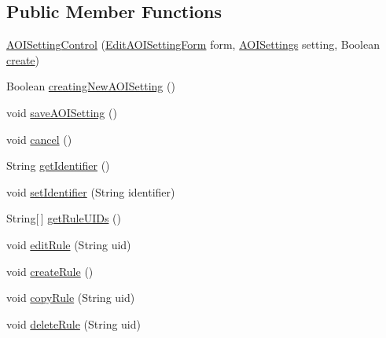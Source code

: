 \subsection*{Public Member Functions}
\begin{DoxyCompactItemize}
\item 
\hyperlink{class_web_analyzer_1_1_u_i_1_1_interaction_objects_1_1_a_o_i_setting_control_aba590b033948b15906956ea0314f6e46}{A\+O\+I\+Setting\+Control} (\hyperlink{class_web_analyzer_1_1_u_i_1_1_edit_a_o_i_setting_form}{Edit\+A\+O\+I\+Setting\+Form} form, \hyperlink{class_web_analyzer_1_1_models_1_1_settings_model_1_1_a_o_i_settings}{A\+O\+I\+Settings} setting, Boolean \hyperlink{_u_i_2_h_t_m_l_resources_2js_2lib_2underscore_8min_8js_a8bd5981157799459d39a59e8c4a0de04}{create})
\item 
Boolean \hyperlink{class_web_analyzer_1_1_u_i_1_1_interaction_objects_1_1_a_o_i_setting_control_a298902c1d52470da4a0141819e55eb4d}{creating\+New\+A\+O\+I\+Setting} ()
\item 
void \hyperlink{class_web_analyzer_1_1_u_i_1_1_interaction_objects_1_1_a_o_i_setting_control_a7d895c94dcd8a3c65249aa6721ae81c8}{save\+A\+O\+I\+Setting} ()
\item 
void \hyperlink{class_web_analyzer_1_1_u_i_1_1_interaction_objects_1_1_a_o_i_setting_control_a2c0ef2d343a35ab51285bf4f1f782a18}{cancel} ()
\item 
String \hyperlink{class_web_analyzer_1_1_u_i_1_1_interaction_objects_1_1_a_o_i_setting_control_af075fa96759a677d9e973b26778981cf}{get\+Identifier} ()
\item 
void \hyperlink{class_web_analyzer_1_1_u_i_1_1_interaction_objects_1_1_a_o_i_setting_control_a8224c2f4018a9df0dd8f485b45207844}{set\+Identifier} (String identifier)
\item 
String\mbox{[}$\,$\mbox{]} \hyperlink{class_web_analyzer_1_1_u_i_1_1_interaction_objects_1_1_a_o_i_setting_control_a62223cb7bae2345f6304940012519c04}{get\+Rule\+U\+I\+Ds} ()
\item 
void \hyperlink{class_web_analyzer_1_1_u_i_1_1_interaction_objects_1_1_a_o_i_setting_control_a08b6ee8feecd8783252291abdcc7e23e}{edit\+Rule} (String uid)
\item 
void \hyperlink{class_web_analyzer_1_1_u_i_1_1_interaction_objects_1_1_a_o_i_setting_control_ad6d4cbe37d7d49b7b9a7e270fd2ad52b}{create\+Rule} ()
\item 
void \hyperlink{class_web_analyzer_1_1_u_i_1_1_interaction_objects_1_1_a_o_i_setting_control_a9dbae7bde830b8c7ad1f6b08c7af4235}{copy\+Rule} (String uid)
\item 
void \hyperlink{class_web_analyzer_1_1_u_i_1_1_interaction_objects_1_1_a_o_i_setting_control_a137a5cbb5cb6d5de541a9ceba0a8e570}{delete\+Rule} (String uid)
\end{DoxyCompactItemize}
